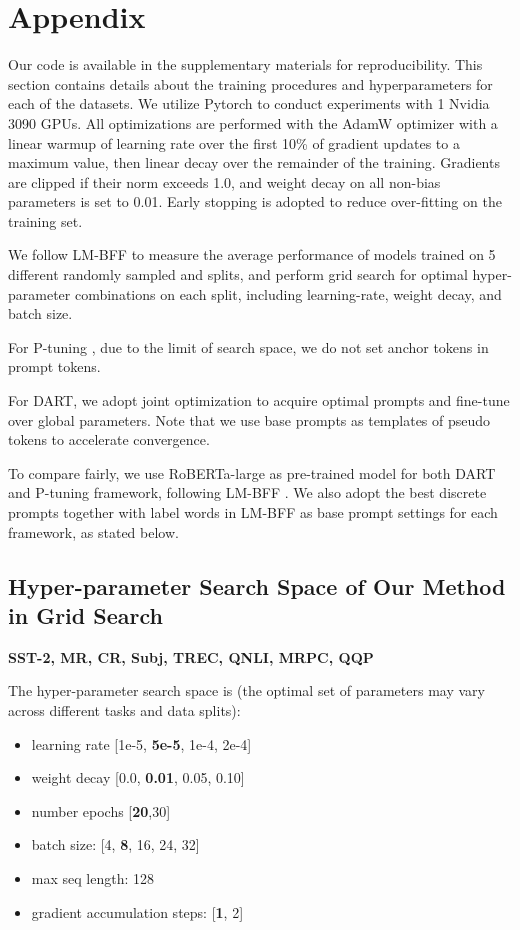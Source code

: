 \documentclass{article} \usepackage{iclr2022_conference,times}
\newcommand{\oursopt}{DART}
\begin{document}
\appendix
\section{Appendix}

Our code is available in the supplementary materials for reproducibility.
This section contains details about the training procedures and hyperparameters for each of the datasets. 
We utilize Pytorch \citep{DBLP:conf/nips/PaszkeGMLBCKLGA19} to conduct experiments with 1 Nvidia 3090 GPUs. 
All optimizations are performed with the AdamW optimizer with a linear warmup of learning rate over the first 10\% of gradient updates to a maximum value, then linear decay over the remainder of the training. 
Gradients are clipped if their norm exceeds 1.0, and weight decay on all non-bias parameters is set to 0.01. 
Early stopping is adopted to reduce over-fitting on the training set.

We follow LM-BFF \citep{DBLP:journals/corr/abs-2012-15723} to measure the average performance of models trained on 5 different randomly sampled  and  splits, and perform grid search for optimal hyper-parameter combinations on each split, including learning-rate, weight decay, and batch size.

For P-tuning \citep{DBLP:journals/corr/abs-2103-10385}, due to the limit of search space, we do not set anchor tokens in prompt tokens.
 
For {\oursopt}, we adopt joint optimization to acquire optimal prompts and fine-tune over global parameters. 
Note that we use base prompts as templates of pseudo tokens to accelerate convergence.
 
To compare fairly, we use RoBERTa-large \citep{DBLP:journals/corr/abs-1907-11692} as pre-trained model for both {\oursopt} and P-tuning framework, following LM-BFF \citep{DBLP:journals/corr/abs-2012-15723}. 
We also adopt the best discrete prompts together with label words in LM-BFF as base prompt settings for each framework, as stated below.
 
\subsection{Hyper-parameter Search Space of Our Method in Grid Search}
\label{app:hyper}

\textbf{SST-2, MR, CR, Subj, TREC, QNLI, MRPC, QQP}

The hyper-parameter search space is (the optimal set of parameters may vary across different tasks and data splits):
\begin{itemize}
\item learning rate
[1e-5, \textbf{5e-5}, 1e-4, 2e-4]
\item weight decay
[0.0, \textbf{0.01}, 0.05, 0.10]
\item number epochs [\textbf{20},30]
\item batch size: [4, \textbf{8}, 16, 24, 32]
\item max seq length: 128
\item gradient accumulation steps: [\textbf{1}, 2]
\end{itemize}
\end{document}
